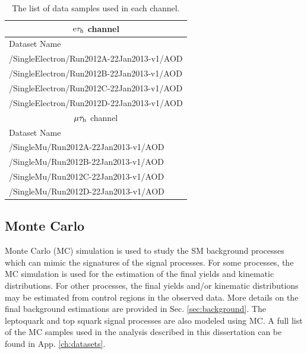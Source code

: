 \begin{table}[hbt]
\begin{center}
\begin{tabular}{|l|}
\multicolumn{1}{c}{$\mathrm{e}\tau_{\text{h}}$ channel} \\
\hline
Dataset Name \\
\hline
/SingleElectron/Run2012A-22Jan2013-v1/AOD \\
/SingleElectron/Run2012B-22Jan2013-v1/AOD \\
/SingleElectron/Run2012C-22Jan2013-v1/AOD \\
/SingleElectron/Run2012D-22Jan2013-v1/AOD \\
\hline
\multicolumn{1}{c}{$\mu\tau_{\text{h}}$ channel} \\ 
\hline
Dataset Name \\
\hline
/SingleMu/Run2012A-22Jan2013-v1/AOD \\
/SingleMu/Run2012B-22Jan2013-v1/AOD \\
/SingleMu/Run2012C-22Jan2013-v1/AOD \\
/SingleMu/Run2012D-22Jan2013-v1/AOD \\
\hline
\end{tabular}
\caption{The list of data samples used in each channel.}
\label{tab:data-samples}
\end{center}
\end{table}

\subsection{Monte Carlo}

Monte Carlo (MC) simulation is used to study the SM background processes which can mimic the signatures of the signal processes. For some processes, the MC simulation is used for the estimation of the final yields and kinematic distributions. For other processes, the final yields and/or kinematic distributions may be estimated from control regions in the observed data. More details on the final background estimations are provided in Sec. \ref{sec:background}. The leptoquark and top squark signal processes are also modeled using MC. A full list of the MC samples used in the analysis described in this dissertation can be found in App. \ref{ch:datasets}.

